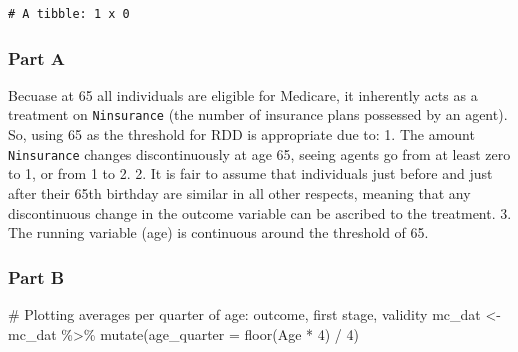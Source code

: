 \documentclass[
  letterpaper,
  DIV=11,
  numbers=noendperiod]{scrartcl}
\newenvironment{Shaded}{\begin{snugshade}}{\end{snugshade}}
\newcommand{\AttributeTok}[1]{\textcolor[rgb]{0.40,0.45,0.13}{#1}}
\newcommand{\CommentTok}[1]{\textcolor[rgb]{0.37,0.37,0.37}{#1}}
\newcommand{\DecValTok}[1]{\textcolor[rgb]{0.68,0.00,0.00}{#1}}
\newcommand{\FunctionTok}[1]{\textcolor[rgb]{0.28,0.35,0.67}{#1}}
\newcommand{\NormalTok}[1]{\textcolor[rgb]{0.00,0.23,0.31}{#1}}
\newcommand{\OtherTok}[1]{\textcolor[rgb]{0.00,0.23,0.31}{#1}}
\newcommand{\SpecialCharTok}[1]{\textcolor[rgb]{0.37,0.37,0.37}{#1}}
\begin{document}
\begin{verbatim}
# A tibble: 1 x 0
\end{verbatim}

\subsubsection{Part A}\label{part-a}

Becuase at 65 all individuals are eligible for Medicare, it inherently
acts as a treatment on \texttt{Ninsurance} (the number of insurance
plans possessed by an agent). So, using 65 as the threshold for RDD is
appropriate due to: 1. The amount \texttt{Ninsurance} changes
discontinuously at age 65, seeing agents go from at least zero to 1, or
from 1 to 2. 2. It is fair to assume that individuals just before and
just after their 65th birthday are similar in all other respects,
meaning that any discontinuous change in the outcome variable can be
ascribed to the treatment. 3. The running variable (age) is continuous
around the threshold of 65.

\subsubsection{Part B}\label{part-b}

\begin{Shaded}
\begin{Highlighting}[]
\CommentTok{\# Plotting averages per quarter of age: outcome, first stage, validity}
\NormalTok{mc\_dat }\OtherTok{\textless{}{-}}\NormalTok{ mc\_dat }\SpecialCharTok{\%\textgreater{}\%}
  \FunctionTok{mutate}\NormalTok{(}\AttributeTok{age\_quarter =} \FunctionTok{floor}\NormalTok{(Age }\SpecialCharTok{*} \DecValTok{4}\NormalTok{) }\SpecialCharTok{/} \DecValTok{4}\NormalTok{)}
\end{Highlighting}
\end{Shaded}
\end{document}
